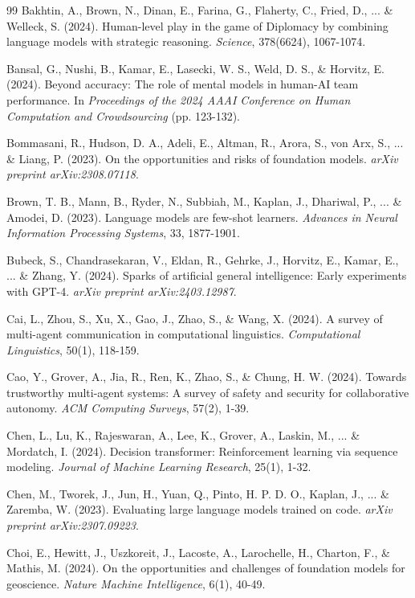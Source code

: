 \begin{thebibliography}{99}
Bakhtin, A., Brown, N., Dinan, E., Farina, G., Flaherty, C., Fried, D., ... \& Welleck, S. (2024). Human-level play in the game of Diplomacy by combining language models with strategic reasoning. \textit{Science}, 378(6624), 1067-1074.

Bansal, G., Nushi, B., Kamar, E., Lasecki, W. S., Weld, D. S., \& Horvitz, E. (2024). Beyond accuracy: The role of mental models in human-AI team performance. In \textit{Proceedings of the 2024 AAAI Conference on Human Computation and Crowdsourcing} (pp. 123-132).

Bommasani, R., Hudson, D. A., Adeli, E., Altman, R., Arora, S., von Arx, S., ... \& Liang, P. (2023). On the opportunities and risks of foundation models. \textit{arXiv preprint arXiv:2308.07118}.

Brown, T. B., Mann, B., Ryder, N., Subbiah, M., Kaplan, J., Dhariwal, P., ... \& Amodei, D. (2023). Language models are few-shot learners. \textit{Advances in Neural Information Processing Systems}, 33, 1877-1901.

Bubeck, S., Chandrasekaran, V., Eldan, R., Gehrke, J., Horvitz, E., Kamar, E., ... \& Zhang, Y. (2024). Sparks of artificial general intelligence: Early experiments with GPT-4. \textit{arXiv preprint arXiv:2403.12987}.

Cai, L., Zhou, S., Xu, X., Gao, J., Zhao, S., \& Wang, X. (2024). A survey of multi-agent communication in computational linguistics. \textit{Computational Linguistics}, 50(1), 118-159.

Cao, Y., Grover, A., Jia, R., Ren, K., Zhao, S., \& Chung, H. W. (2024). Towards trustworthy multi-agent systems: A survey of safety and security for collaborative autonomy. \textit{ACM Computing Surveys}, 57(2), 1-39.

Chen, L., Lu, K., Rajeswaran, A., Lee, K., Grover, A., Laskin, M., ... \& Mordatch, I. (2024). Decision transformer: Reinforcement learning via sequence modeling. \textit{Journal of Machine Learning Research}, 25(1), 1-32.

Chen, M., Tworek, J., Jun, H., Yuan, Q., Pinto, H. P. D. O., Kaplan, J., ... \& Zaremba, W. (2023). Evaluating large language models trained on code. \textit{arXiv preprint arXiv:2307.09223}.

Choi, E., Hewitt, J., Uszkoreit, J., Lacoste, A., Larochelle, H., Charton, F., \& Mathis, M. (2024). On the opportunities and challenges of foundation models for geoscience. \textit{Nature Machine Intelligence}, 6(1), 40-49.


\end{thebibliography}
